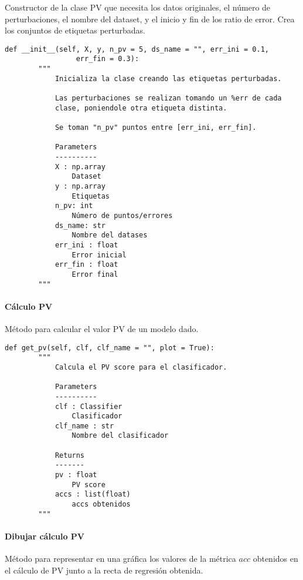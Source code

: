 Constructor de la clase PV que necesita los datos originales, el número de perturbaciones, el nombre del dataset, y el inicio y fin de los ratio de error. Crea los conjuntos de etiquetas perturbadas.

\begin{lstlisting}
def __init__(self, X, y, n_pv = 5, ds_name = "", err_ini = 0.1,
                 err_fin = 0.3):
        """
            Inicializa la clase creando las etiquetas perturbadas.

            Las perturbaciones se realizan tomando un %err de cada
            clase, poniendole otra etiqueta distinta.

            Se toman "n_pv" puntos entre [err_ini, err_fin].

            Parameters
            ----------
            X : np.array
                Dataset
            y : np.array
                Etiquetas
            n_pv: int
                Número de puntos/errores
            ds_name: str
                Nombre del datases
            err_ini : float
                Error inicial
            err_fin : float
                Error final
        """
\end{lstlisting}

\paragraph{Cálculo PV}

Método para calcular el valor PV de un modelo dado.

\begin{lstlisting}
def get_pv(self, clf, clf_name = "", plot = True):
        """
            Calcula el PV score para el clasificador.

            Parameters
            ----------
            clf : Classifier
                Clasificador
            clf_name : str
                Nombre del clasificador

            Returns
            -------
            pv : float
                PV score
            accs : list(float)
                accs obtenidos
        """
\end{lstlisting}

\paragraph{Dibujar cálculo PV}

Método para representar en una gráfica los valores de la métrica $acc$ obtenidos en el cálculo de PV junto a la recta de regresión obtenida.


